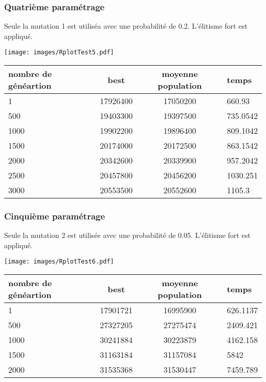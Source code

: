 \documentclass[a4paper]{report}
\begin{document}
\subsubsection*{Quatrième paramétrage}
Seule la mutation 1 est utiliséa avec une probabilité de 0.2. L'élitisme fort est appliqué.

\begin{center}
\texttt{[image: images/RplotTest5.pdf]}
\end{center}
\begin{tabular}{|l|c|c|l|}
  \hline
  nombre de généartion & best &moyenne population&temps \\

  \hline
 1 &17926400& 17050200& 660.93\\
  \hline
500 & 19403300 &19397500 &   735.0542
\\
  \hline
  1000&  19902200&19896400& 809.1042
\\
  \hline
  1500 &20174000& 20172500&863.1542

\\
  \hline
 2000 & 20342600&20339900&957.2042 \\
  \hline
2500 & 20457800&   20456200&  1030.251\\
\hline
3000 & 20553500 &    20552600& 1105.3\\ 
\hline

\end{tabular}
\subsubsection*{Cinquième paramétrage}
Seule la mutation 2 est utilisée avec une probabilité de 0.05. L'élitisme fort est appliqué.


\begin{center}
\texttt{[image: images/RplotTest6.pdf]}
\end{center}
\begin{tabular}{|l|c|c|l|}
  \hline
  nombre de généartion & best &moyenne population&temps \\

  \hline
 1 &17901721&16995900& 626.1137\\
  \hline
500 & 27327205 &27275474 &  2409.421
\\
  \hline
  1000&  30241884&30223879&  4162.158
\\
  \hline
  1500 &31163184& 31157084&5842

\\
  \hline
 2000 &31535368& 31530447&7459.789 \\
  \hline


\end{tabular}
\\
\end{document}
